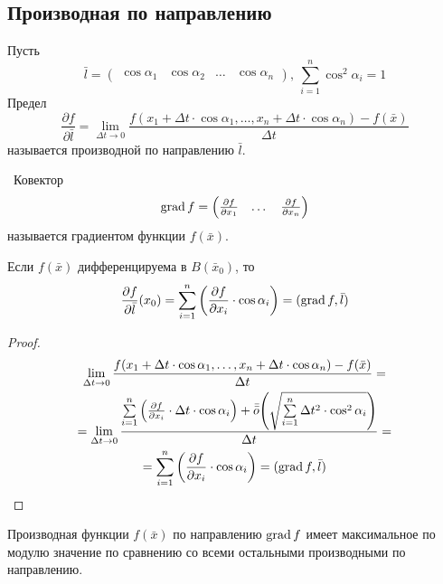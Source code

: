 \subsection{Производная по направлению}
\begin{definition}
    Пусть
    \[\bar{l}=\begin{pmatrix}
        \cos{\alpha_1} & \cos{\alpha_2} & \dots & \cos{\alpha_n}
    \end{pmatrix},\
    \sum\limits_{i=1}^{n}\cos^2{\alpha_i}=1
    \]
    Предел
    \[\frac{\partial {f}}{\partial {\bar{l}}}=\lim\limits_{\Delta t\to 0}\frac{f(x_1+\Delta t \cdot \cos{\alpha_1},\dots,x_n+\Delta t \cdot \cos{\alpha_n})-f(\bar{x})}{\Delta t}\]
    называется производной по направлению $\bar{l}$.
\end{definition} 
\begin{definition}\
    Ковектор
    \[
    \operatorname*{grad}{f}=\begin{pmatrix}
        \frac{\partial {f}}{\partial {x_1}} & \dots & \frac{\partial {f}}{\partial {x_n}}
    \end{pmatrix}
    \]
    называется градиентом функции $f(\bar{x})$.
\end{definition} 
\begin{theorem}
    Если $f(\bar{x})$ дифференцируема в $B(\bar{x}_0)$, то
    \[\frac{\partial {f}}{\partial {\bar{l}}}(x_0)=\sum\limits_{i=1}^{n}\left(\frac{\partial {f}}{\partial {x_i}}\cdot \cos{\alpha_i}\right)=(\operatorname*{grad} f,\bar{l})\]
\end{theorem} 
\begin{proof}
    \begin{multline*}
        \lim\limits_{\Delta t\to 0}\frac{f(x_1+\Delta t \cdot \cos{\alpha_1},\dots,x_n+\Delta t \cdot \cos{\alpha_n})-f(\bar{x})}{\Delta t}=\\
        =\lim\limits_{\Delta t\to 0}\frac{\sum\limits_{i=1}^{n}\left(\frac{\partial {f}}{\partial {x_i}}\cdot \Delta t\cdot \cos{\alpha_i}\right)+\bar{\bar{o}}{\left(\sqrt{\sum\limits_{i=1}^{n}\Delta t^2\cdot \cos^2{\alpha_i}}\right)}}{\Delta t}=\\
        =\sum\limits_{i=1}^{n}\left( \frac{\partial {f}}{\partial {x_i}}\cdot \cos{\alpha_i}\right)=(\operatorname*{grad} f,\bar{l})
    \end{multline*}
\end{proof}
\begin{theorem}
    Производная функции $f(\bar{x})$ по направлению $\operatorname*{grad}{f}$ имеет максимальное по модулю значение по сравнению со всеми остальными производными по направлению.
\end{theorem} 
